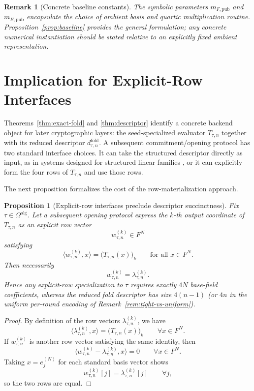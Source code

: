 \documentclass[11pt]{article}
\newtheorem{proposition}[theorem]{Proposition}
\newtheorem{remark}[theorem]{Remark}
\begin{document}
\begin{remark}[Concrete baseline constants]
The symbolic parameters \(m_{F,\mathrm{pub}}\) and \(m_{E,\mathrm{pub}}\) encapsulate the choice of ambient basis and quartic multiplication routine. Proposition~\ref{prop:baseline} provides the general formulation; any concrete numerical instantiation should be stated relative to an explicitly fixed ambient representation.
\end{remark}

\section{Implication for Explicit-Row Interfaces}

Theorems~\ref{thm:exact-fold} and \ref{thm:descriptor} identify a concrete backend object for later cryptographic layers: the seed-specialized evaluator \(T_{\tau,n}\) together with its reduced descriptor \(d^{\mathrm{fold}}_{\tau,n}\). A subsequent commitment/opening protocol has two standard interface choices. It can take the structured descriptor directly as input, as in systems designed for structured linear families \cite{CampanelliEtAl2022LMVC,CatalanoFioreTucker2022AHFC,BalbasCatalanoFioreLai2022CFC,FischLiuVesely2024Orbweaver}, or it can explicitly form the four rows of \(T_{\tau,n}\) and use those rows.

The next proposition formalizes the cost of the row-materialization approach.

\begin{proposition}[Explicit-row interfaces preclude descriptor succinctness]
\label{prop:explicit-row}
Fix \(\tau\in\Omega^{\mathrm{alg}}\). Let a subsequent opening protocol express the \(k\)-th output coordinate of \(T_{\tau,n}\) as an explicit row vector
\[
w_{\tau,n}^{(k)}\in F^N
\]
satisfying
\[
\langle w_{\tau,n}^{(k)},x\rangle=\big(T_{\tau,n}(x)\big)_k
\qquad
\text{for all }x\in F^N.
\]
Then necessarily
\[
w_{\tau,n}^{(k)}=\lambda_{\tau,n}^{(k)}.
\]
Hence any explicit-row specialization to \(\tau\) requires exactly \(4N\) base-field coefficients, whereas the reduced fold descriptor has size \(4(n-1)\) (or \(4n\) in the uniform per-round encoding of Remark~\ref{rem:tight-vs-uniform}).
\end{proposition}

\begin{proof}
By definition of the row vectors \(\lambda_{\tau,n}^{(k)}\), we have
\[
\langle \lambda_{\tau,n}^{(k)},x\rangle=\big(T_{\tau,n}(x)\big)_k
\qquad
\forall x\in F^N.
\]
If \(w_{\tau,n}^{(k)}\) is another row vector satisfying the same identity, then
\[
\langle w_{\tau,n}^{(k)}-\lambda_{\tau,n}^{(k)},x\rangle=0
\qquad
\forall x\in F^N.
\]
Taking \(x=e_j^{(N)}\) for each standard basis vector shows
\[
w_{\tau,n}^{(k)}[j]=\lambda_{\tau,n}^{(k)}[j]
\qquad
\forall j,
\]
so the two rows are equal.
\end{proof}
\end{document}
